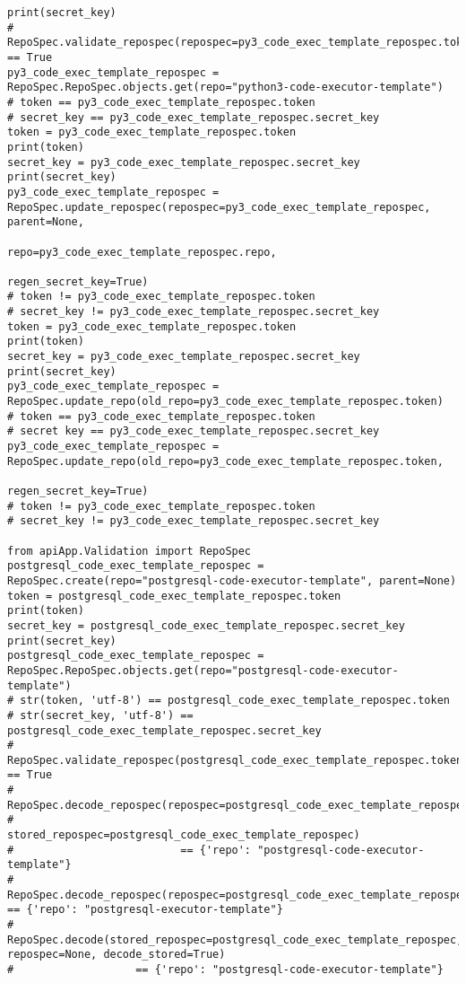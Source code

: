 \begin{lstlisting}[breaklines]
print(secret_key)
# RepoSpec.validate_repospec(repospec=py3_code_exec_template_repospec.token) == True
py3_code_exec_template_repospec = RepoSpec.RepoSpec.objects.get(repo="python3-code-executor-template")
# token == py3_code_exec_template_repospec.token
# secret_key == py3_code_exec_template_repospec.secret_key
token = py3_code_exec_template_repospec.token
print(token)
secret_key = py3_code_exec_template_repospec.secret_key
print(secret_key)
py3_code_exec_template_repospec = RepoSpec.update_repospec(repospec=py3_code_exec_template_repospec, parent=None,
                                                           repo=py3_code_exec_template_repospec.repo,
                                                           regen_secret_key=True)
# token != py3_code_exec_template_repospec.token
# secret_key != py3_code_exec_template_repospec.secret_key
token = py3_code_exec_template_repospec.token
print(token)
secret_key = py3_code_exec_template_repospec.secret_key
print(secret_key)
py3_code_exec_template_repospec = RepoSpec.update_repo(old_repo=py3_code_exec_template_repospec.token)
# token == py3_code_exec_template_repospec.token
# secret key == py3_code_exec_template_repospec.secret_key
py3_code_exec_template_repospec = RepoSpec.update_repo(old_repo=py3_code_exec_template_repospec.token,
                                                       regen_secret_key=True)
# token != py3_code_exec_template_repospec.token
# secret_key != py3_code_exec_template_repospec.secret_key

from apiApp.Validation import RepoSpec
postgresql_code_exec_template_repospec = RepoSpec.create(repo="postgresql-code-executor-template", parent=None)
token = postgresql_code_exec_template_repospec.token
print(token)
secret_key = postgresql_code_exec_template_repospec.secret_key
print(secret_key)
postgresql_code_exec_template_repospec = RepoSpec.RepoSpec.objects.get(repo="postgresql-code-executor-template")
# str(token, 'utf-8') == postgresql_code_exec_template_repospec.token
# str(secret_key, 'utf-8') == postgresql_code_exec_template_repospec.secret_key
# RepoSpec.validate_repospec(postgresql_code_exec_template_repospec.token) == True
# RepoSpec.decode_repospec(repospec=postgresql_code_exec_template_repospec.token,
#                          stored_repospec=postgresql_code_exec_template_repospec)
#                          == {'repo': "postgresql-code-executor-template"}
# RepoSpec.decode_repospec(repospec=postgresql_code_exec_template_repospec.token) == {'repo': "postgresql-executor-template"}
# RepoSpec.decode(stored_repospec=postgresql_code_exec_template_repospec, repospec=None, decode_stored=True)
#                   == {'repo': "postgresql-code-executor-template"}
\end{lstlisting}
\lstset{language=Bash}

